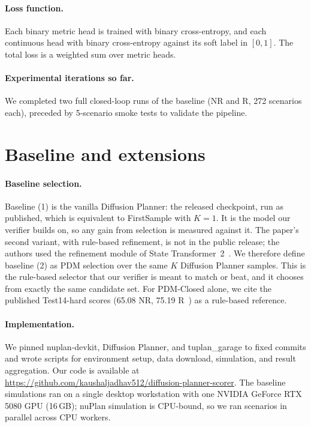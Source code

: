 \documentclass{article}
\begin{document}
\paragraph{Loss function.}
Each binary metric head is trained with binary cross-entropy, and each continuous head with binary cross-entropy against its soft label in $[0,1]$. The total loss is a weighted sum over metric heads.

\paragraph{Experimental iterations so far.}
We completed two full closed-loop runs of the baseline (NR and R, 272 scenarios each), preceded by 5-scenario smoke tests to validate the pipeline.

\section{Baseline and extensions}
\label{sec:baselines}

\paragraph{Baseline selection.}
Baseline (1) is the vanilla Diffusion Planner: the released checkpoint, run as published, which is equivalent to FirstSample with $K=1$. It is the model our verifier builds on, so any gain from selection is measured against it. The paper's second variant, with rule-based refinement, is not in the public release; the authors used the refinement module of State Transformer~2~\cite{dp_issue14}. We therefore define baseline (2) as PDM selection over the same $K$ Diffusion Planner samples. This is the rule-based selector that our verifier is meant to match or beat, and it chooses from exactly the same candidate set. For PDM-Closed alone, we cite the published Test14-hard scores (65.08 NR, 75.19 R~\cite{zheng2025diffusion}) as a rule-based reference.

\paragraph{Implementation.}
We pinned nuplan-devkit, Diffusion Planner, and tuplan\_garage to fixed commits and wrote scripts for environment setup, data download, simulation, and result aggregation. Our code is available at \url{https://github.com/kaushaljadhav512/diffusion-planner-scorer}. The baseline simulations ran on a single desktop workstation with one NVIDIA GeForce RTX 5080 GPU (16\,GB); nuPlan simulation is CPU-bound, so we ran scenarios in parallel across CPU workers.
\end{document}
